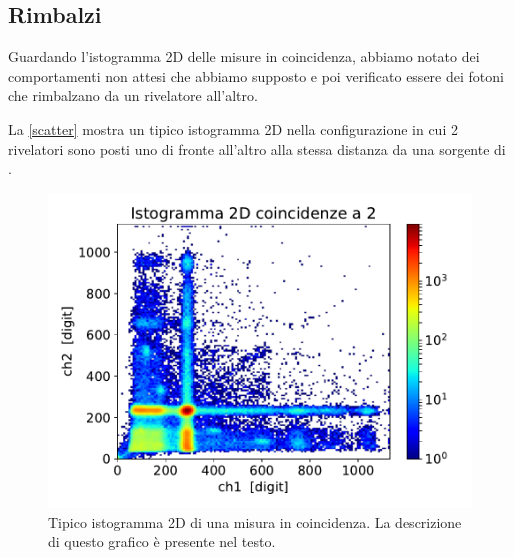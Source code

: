 \subsection{Rimbalzi}

Guardando l'istogramma 2D delle misure in coincidenza, abbiamo notato dei comportamenti non attesi che abbiamo supposto e poi verificato essere dei fotoni che rimbalzano da un rivelatore all'altro.

La \autoref{scatter} mostra un tipico istogramma 2D
nella configurazione in cui 2 rivelatori sono posti uno di fronte all'altro alla stessa distanza da una sorgente di \na{}.

\begin{figure}[h]
\centering
\includegraphics[width=\textwidth]{immagini/esempio}
\caption{Tipico istogramma 2D di una misura in coincidenza. La descrizione di questo grafico è presente nel testo.}
\label{scatter}
\end{figure}


